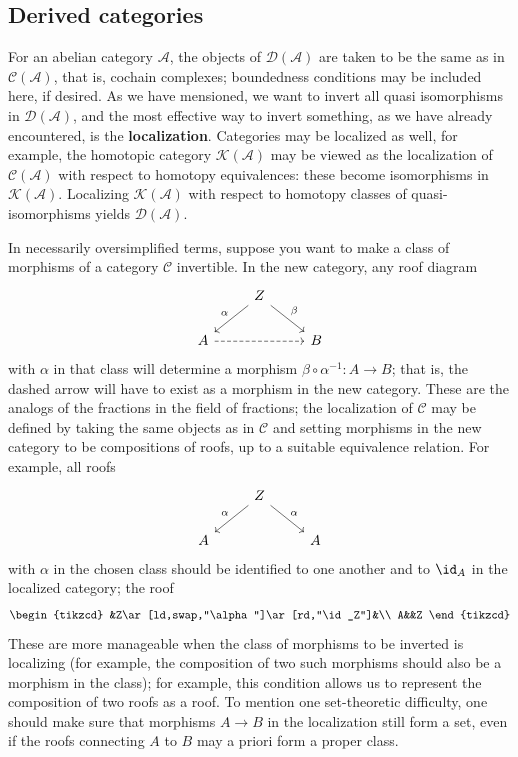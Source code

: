 \subsection{Derived categories}
For an abelian category $\mathcal{A}$, the objects of $\mathcal{D}(\mathcal{A})$ are taken to be the same as in $\mathcal{C}(\mathcal{A})$, that is, cochain complexes; boundedness conditions may be included here, if desired. As we have mensioned, we want to invert all quasi isomorphisms in $\mathcal{D}(\mathcal{A})$, and the most effective way to invert something, as we have already encountered, is the \textbf{localization}. Categories may be localized as well, for example, the homotopic category $\mathcal{K}(\mathcal{A})$ may be viewed as the localization of $\mathcal{C}(\mathcal{A})$ with respect to homotopy equivalences: these become isomorphisms in $\mathcal{K}(\mathcal{A})$. Localizing $\mathcal{K}(\mathcal{A})$ with respect to homotopy classes of quasi-isomorphisms yields $\mathcal{D}(\mathcal{A})$.\par
In necessarily oversimplified terms, suppose you want to make a class of morphisms of a category $\mathcal{C}$ invertible. In the new category, any roof diagram
\[\begin{tikzcd}
&Z\ar[ld,swap,"\alpha"]\ar[rd,"\beta"]&\\
A\ar[rr,dashed]&&B
\end{tikzcd}\]
with $\alpha$ in that class will determine a morphism $\beta\circ\alpha^{-1}:A\to B$; that is, the dashed arrow will have to exist as a morphism in the new category. These are the analogs of the fractions in the field of fractions; the localization of $\mathcal{C}$ may be defined by taking the same objects as in $\mathcal{C}$ and setting morphisms in the new category to be compositions of roofs, up to a suitable equivalence relation. For example, all roofs
\[\begin{tikzcd}
&Z\ar[ld,swap,"\alpha"]\ar[rd,"\alpha"]&\\
A&&A
\end{tikzcd}\]
with $\alpha$ in the chosen class should be identified to one another and to $\id_A$ in the localized category; the roof
\[\begin{tikzcd}
&Z\ar[ld,swap,"\alpha"]\ar[rd,"\id_Z"]&\\
A&&Z
\end{tikzcd}\]
These are more manageable when the class of morphisms to be inverted is localizing (for example, the composition of two such morphisms should also be a morphism in the class); for example, this condition allows us to represent the composition of two roofs as a roof. To mention one set-theoretic difficulty, one should make sure that morphisms $A\to B$ in the localization still form a set, even if the roofs connecting $A$ to $B$ may a priori form a proper class.\par
